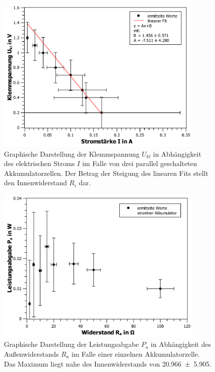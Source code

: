 \begin{figure}[ht]
	\centering
	\includegraphics[width=0.9\textwidth]{auswertung/I-U3.pdf}
	\caption{Graphische Darstellung der Klemmspannung $U_{kl}$ in Abhängigkeit des elektrischen Stroms $I$ im Falle von drei parallel geschalteten Akkumulatorzellen. Der Betrag der Steigung des linearen Fits stellt den Innenwiderstand $R_i$ dar.}
	\label{fig:IU3}	
\end{figure}
\begin{figure}[ht]
	\centering
	\includegraphics[width=0.9\textwidth]{auswertung/R-P1.pdf}
	\caption{Graphische Darstellung der Leistungsabgabe $P_a$ in Abhängigkeit des Außenwiderstands $R_a$ im Falle einer einzelnen Akkumulatorzelle. Das Maximum liegt nahe des Innenwiderstands von \SI{20,966+-5,905}{\Omega}.}
	\label{fig:RP1}	
\end{figure}
